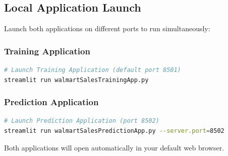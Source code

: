\subsection{Local Application Launch}

Launch both applications on different ports to run simultaneously:

\subsubsection{Training Application}
\begin{lstlisting}[language=bash]
# Launch Training Application (default port 8501)
streamlit run walmartSalesTrainingApp.py
\end{lstlisting}

\subsubsection{Prediction Application}
\begin{lstlisting}[language=bash]
# Launch Prediction Application (port 8502)
streamlit run walmartSalesPredictionApp.py --server.port=8502
\end{lstlisting}

Both applications will open automatically in your default web browser.

